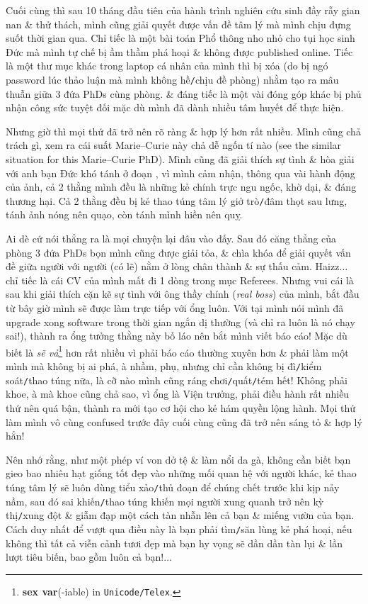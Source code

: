 \documentclass[12pt,oneside]{book}
\begin{document}
Cuối cùng thì sau 10 tháng đầu tiên của hành trình nghiên cứu sinh đầy rẫy gian nan \& thử thách, mình cũng giải quyết được vấn đề tâm lý mà mình chịu đựng suốt thời gian qua. Chỉ tiếc là một bài toán Phổ thông nho nhỏ cho tụi học sinh Đức mà mình tự chế bị ầm thầm phá hoại \& không được published online. Tiếc là một thư mục khác trong laptop cá nhân của mình thì bị xóa (do bị ngó password lúc thảo luận mà mình không hề{\tt/}chịu đề phòng) nhằm tạo ra mâu thuẫn giữa 3 đứa PhDs cùng phòng. \& đáng tiếc là một vài đóng góp khác bị phủ nhận công sức tuyệt đối mặc dù mình đã dành nhiều tâm huyết để thực hiện.

Nhưng giờ thì mọi thứ đã trở nên rõ ràng \& hợp lý hơn rất nhiều. Mình cũng chả trách gì, xem ra cái suất {\sc Marie--Curie} này chả dễ ngốn tí nào (see the similar situation for this {\sc Marie--Curie} PhD). Mình cũng đã giải thích sự tình \& hòa giải với anh bạn Đức khó tánh ở đoạn , vì mình cảm nhận, thông qua vài hành động của ảnh, cả 2 thằng mình đều là những kẻ chính trực ngu ngốc, khờ dại, \& đáng thương hại. Cả 2 thằng đều bị kẻ thao túng tâm lý giở trò{\tt/}đâm thọt sau lưng, tánh ảnh nóng nên quạo, còn tánh mình hiền nên quỵ.

Ai dè cứ nói thẳng ra là mọi chuyện lại đâu vào đấy. Sau đó căng thẳng của phòng 3 đứa PhDs bọn mình cũng được giải tỏa, \& chìa khóa để giải quyết vấn đề giữa người với người (có lẽ) nằm ở lòng chân thành \& sự thấu cảm. Haizz$\ldots$ chỉ tiếc là cái CV của mình mất đi 1 dòng trong mục Referees. Nhưng vui cái là sau khi giải thích cặn kẽ sự tình với ông thầy chính ({\it real boss}) của mình, bắt đầu từ bây giờ mình sẽ được làm trực tiếp với ổng luôn. Với tại mình nói mình đã upgrade xong software trong thời gian ngắn dị thường (và chỉ ra luôn là nó chạy sai!), thành ra ổng tưởng thằng này bố láo nên bắt mình viết báo cáo! Mặc dù biết là {\it sẽ vả}\footnote{{\bf sex var}(-iable) in {\tt Unicode/Telex}.} hơn rất nhiều vì phải báo cáo thường xuyên hơn \& phải làm một mình mà không bị ai phá, à nhầm, phụ, nhưng chỉ cần không bị đì{\tt/}kiểm soát{\tt/}thao túng nữa, là cỡ nào mình cũng ráng chơi{\tt/}quất{\tt/}tém hết! Không phải khoe, à mà khoe cũng chả sao, vì ổng là Viện trưởng, phải điều hành rất nhiều thứ nên quá bận, thành ra mới tạo cơ hội cho kẻ hám quyền lộng hành. Mọi thứ làm mình vô cùng confused trước đây cuối cùng cũng đã trở nên sáng tỏ \& hợp lý hẳn!

Nên nhớ rằng, như một phép ví von dở tệ \& làm nổi da gà, không cần biết bạn gieo bao nhiêu hạt giống tốt đẹp vào những mối quan hệ với người khác, kẻ thao túng tâm lý sẽ luôn dùng tiểu xảo{\tt/}thủ đoạn để chúng chết trước khi kịp nảy nầm, sau đó sai khiến{\tt/}thao túng khiến mọi người xung quanh trở nên kỳ thị{\tt/}xung đột \& giẫm đạp một cách tàn nhẫn lên cả bạn \& miếng vườn của bạn. Cách duy nhất để vượt qua điều này là bạn phải tìm{\tt/}săn lùng kẻ phá hoại, nếu không thì tất cả viễn cảnh tươi đẹp mà bạn hy vọng sẽ dần dần tàn lụi \& lần lượt tiêu biến, bao gồm luôn cả bạn!$\ldots$
\end{document}
